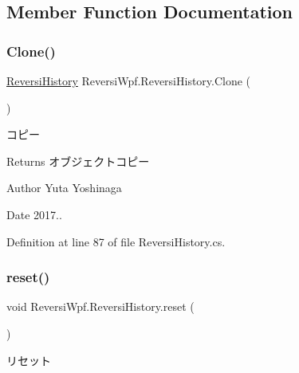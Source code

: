 \subsection{Member Function Documentation}
\mbox{\label{class_reversi_wpf_1_1_reversi_history_a3f8fa9ca02b1fdb6068e9ae3ebdc80f8}} 
\subsubsection{\texorpdfstring{Clone()}{Clone()}}
{\footnotesize\ttfamily \hyperlink{class_reversi_wpf_1_1_reversi_history}{Reversi\+History} Reversi\+Wpf.\+Reversi\+History.\+Clone (\begin{DoxyParamCaption}{ }\end{DoxyParamCaption})}



コピー 

\begin{DoxyReturn}{Returns}
オブジェクトコピー 
\end{DoxyReturn}
\begin{DoxyAuthor}{Author}
Yuta Yoshinaga 
\end{DoxyAuthor}
\begin{DoxyDate}{Date}
2017.. 
\end{DoxyDate}


Definition at line 87 of file Reversi\+History.\+cs.

\mbox{\label{class_reversi_wpf_1_1_reversi_history_a2a57686bf23df7dcfa8ee9cd8cdc7fdb}} 
\subsubsection{\texorpdfstring{reset()}{reset()}}
{\footnotesize\ttfamily void Reversi\+Wpf.\+Reversi\+History.\+reset (\begin{DoxyParamCaption}{ }\end{DoxyParamCaption})}



リセット 

